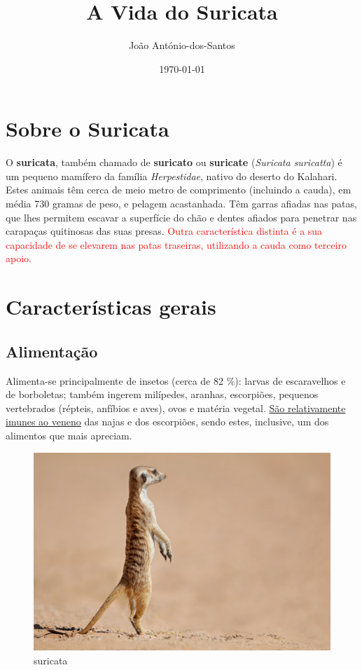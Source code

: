 \documentclass[12pt, a4paper]{article}
\title{A Vida do Suricata}
\author{João António-dos-Santos}
\date{\today}
\begin{document}
\maketitle
\section{Sobre o Suricata}
O \textbf{suricata}, também chamado de \textbf{suricato} ou \textbf{suricate} (\textit{Suricata suricatta}) é um pequeno mamífero da família \textit{Herpestidae}, nativo do deserto
do Kalahari. Estes animais têm cerca de meio metro de comprimento
(incluindo a cauda), em média 730 gramas de peso, e pelagem acastanhada. Têm garras afiadas nas patas, que lhes permitem escavar a superfície do ch\~ao e dentes afiados para penetrar nas carapaças quitinosas das suas presas. \textcolor{red} {Outra característica distinta é a sua capacidade de
se elevarem nas patas traseiras, utilizando a cauda como terceiro apoio.}
\section{Características gerais}
\subsection{Alimentação}
Alimenta-se principalmente de insetos (cerca de 82 \%): larvas de escaravelhos e de borboletas; também ingerem milípedes, aranhas, escorpi\~oes, pequenos vertebrados (répteis, anfíbios e aves), ovos e matéria vegetal. \uline {S\~ao relativamente imunes ao veneno} das najas e dos
escorpi\~oes, sendo estes, inclusive, um dos alimentos que mais apreciam.
\begin{figure}
\centering
\includegraphics[scale=0.2]{suricata.jpg}
\caption{suricata}
\end{figure}
\end{document}
